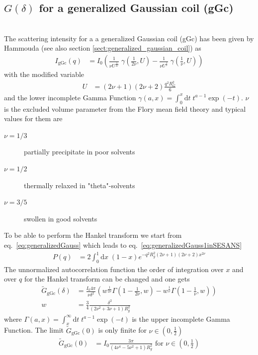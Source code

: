 \subsection{$G(\delta)$ for a generalized Gaussian coil (gGc) }~\\
\label{sec:Gz_gGc}
The scattering intensity for a a generalized Gaussian coil (gGc) has been given by  Hammouda \cite{Hammouda,Hammouda2012,Hammouda1993,Hammouda2016} (see also section \ref{sect:generalized_gaussian_coil}) as
\begin{align}
I_\text{gGc}(q) &= I_0
\left(
\frac{1}{\nu U^{\frac{1}{2 \nu}}} \; \gamma\left(\frac{1}{2 \nu},U\right)-
\frac{1}{\nu U^{\frac{1}{  \nu}}} \; \gamma\left(\frac{1}{  \nu},U\right)
\right)
\label{eq:generalizedGauss1inSESANS}
\end{align}
with the modified variable
\begin{align}
U&= \left(2\nu+1\right)\left(2\nu+2\right)\frac{q^2R_G^2}{6}
\end{align}
and the lower incomplete Gamma Function $\gamma(a,x) = \int_0^x \mathrm{d}t \; t^{a-1} \exp(-t)$.
$\nu$ is the excluded volume parameter from the Flory mean field theory and typical values for them are
\begin{description}
\item[$\nu=1/3$] partially precipitate in poor solvents
\item[$\nu=1/2$] thermally relaxed in "theta"-solvents
\item[$\nu=3/5$] swollen in good solvents
\end{description}
To be able to perform the Hankel transform we start from eq.\ \ref{eq:generalizedGauss} which leads to eq.\ \ref{eq:generalizedGauss1inSESANS}
\begin{align}
P(q) &= 2\int_0^1 \mathrm{d}x \; (1-x)e^{-q^2R_g^2(2\nu+1)(2\nu+2)x^{2\nu}}
\label{eq:generalizedGaussinSESANS}
\end{align}
The unnormalized autocorrelation function the order of integration over $x$ and  over $q$ for the Hankel transform can be changed and one gets
\begin{align}
\tilde{G}_\mathrm{gGc}(\delta) &=
 \frac{I_0 4\pi}{\nu \delta^2} \left(
   w^{\frac{1}{2\nu}} \Gamma \left(1-\frac{1}{2 \nu },w\right) - w^{\frac{1}{\nu }} \Gamma \left(1-\frac{1}{\nu },w\right) \right) \label{eq:Gz_gGc}\\
   w &= \frac34 \frac{\delta^2}{\left(2 \nu ^2+3 \nu +1\right) R_g^2}
\end{align}
where $\Gamma(a,x) = \int_x^\infty \mathrm{d}t \; t^{a-1} \exp(-t)$ is the upper incomplete Gamma Function.
The limit $\tilde{G}_\mathrm{gGc}(0)$ is only finite for $\nu \in \left(0,\frac12\right)$
\begin{align}
\tilde{G}_\mathrm{gGc}(0) &= I_0 \frac{3 \pi }{\left(4 \nu ^4-5 \nu ^2+1\right) R_g^2} \mbox{~for~} \nu \in \left(0,\frac12\right) \label{eq:G0_gGc}
\end{align}

